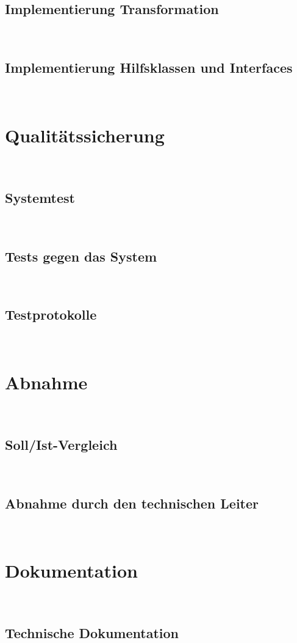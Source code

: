 \documentclass[11pt,toc=sectionentrywithoutdots, 
headheight=44pt, headings=optiontoheadandtoc, hyperfootnotes=false, hypertexnames=false]{scrartcl}
\begin{document}
\subsection{Implementierung Transformation}
\blindtext\

\subsection{Implementierung Hilfsklassen und Interfaces}
\blindtext\

\section{Qualitätssicherung}
\blindtext\

\subsection{Systemtest}
\blindtext\

\subsection{Tests gegen das System}
\blindtext\

\subsection{Testprotokolle}
\blindtext\

\section{Abnahme}
\blindtext\

\subsection{Soll/Ist-Vergleich}
\blindtext\

\subsection{Abnahme durch den technischen Leiter}
\blindtext\

\section{Dokumentation}
\blindtext\

\subsection{Technische Dokumentation}
\blindtext\
\end{document}
